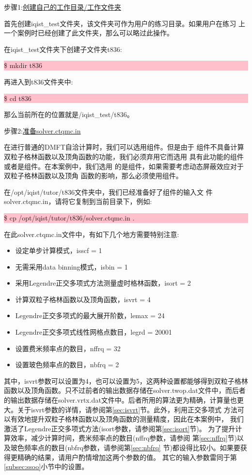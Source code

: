 步骤1:\underline{创建自己的工作目录/工作文件夹}

首先创建iqist\_test文件夹，该文件夹可作为用户的练习目录。如果用户在练习
上一个案例时已经创建了此文件夹，那么可以略过此操作。

在iqist\_test文件夹下创建子文件夹t836:

\noindent\colorbox{pink}{\parbox[r]{\linewidth}{\quad \$ mkdir t836 }}

再进入到t836文件夹中:

\noindent\colorbox{pink}{\parbox[r]{\linewidth}{\quad \$ cd t836 }}

那么当前所在的位置就是/iqist\_test/t836。

步骤2:\underline{准备solver.ctqmc.in}

在进行普通的DMFT自洽计算时，我们可以选用{\azalea}组件。但是由于{\azalea}
组件不具备计算双粒子格林函数以及顶角函数的功能，我们必须弃用它而选用
具有此功能的{\gardenia}组件或者是{\narcissus}组件。在本案例中，我们选用
的是{\gardenia}组件，如果需要考虑动态屏蔽效应对于双粒子格林函数以及顶角
函数的影响，那么必须使用{\narcissus}组件。

在/opt/iqist/tutor/t836文件夹中，我们已经准备好了{\gardenia}组件的输入文
件solver.ctqmc.in，请将它复制到当前目录下，例如:

\noindent\colorbox{pink}{\parbox[r]{\linewidth}{\quad \$ cp /opt/iqist/tutor/t836/solver.ctqmc.in . }}

在此solver.ctqmc.in文件中，有如下几个地方需要特别注意:
\begin{itemize}
  \item 设定单步计算模式，isscf = 1
  \item 无需采用data binning模式，isbin = 1
  \item 采用Legendre正交多项式方法测量虚时格林函数，isort = 2
  \item 计算双粒子格林函数以及顶角函数，isvrt = 4
  \item Legendre正交多项式的最大展开阶数，lemax = 24
  \item Legendre正交多项式线性网格点数目，legrd = 20001
  \item 设置费米频率点的数目，nffrq = 32
  \item 设置玻色频率点的数目，nbfrq = 2
\end{itemize}

其中，isvrt参数可以设置为4，也可以设置为5，这两种设置都能够得到双粒子格林
函数以及顶角函数。只不过前者的输出数据存储在solver.twop.dat文件中，而后者
的输出数据存储在solver.vrtx.dat文件中。后者所用的算法更为精确，计算量也更
大。关于isvrt参数的详情，请参阅第\ref{sec:isvrt}节。此外，利用正交多项式
方法可以有效地提升双粒子格林函数以及顶角函数的测量精度，因此在本案例中，
我们激活了Legendre正交多项式方法(isort参数，请参阅第\ref{sec:isort}节)。
为了提升计算效率，减少计算时间，费米频率点的数目(nffrq参数，请参阅
第\ref{sec:nffrq}节)以及玻色频率点的数目(nbfrq参数，请参阅第\ref{sec:nbfrq}
节)都设得比较小。如果要获得更精确的结果，请用户酌情增加这两个参数的值。
其它的输入参数雷同于第\ref{subsec:ssoo}小节中的设置。

